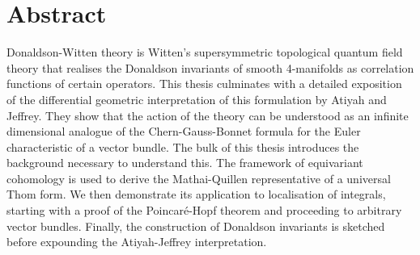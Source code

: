 \chapter*{Abstract}\label{abstract}


Donaldson-Witten theory is Witten's supersymmetric topological quantum field
theory that realises the Donaldson invariants of smooth 4-manifolds as
correlation functions of certain operators. This thesis culminates with a
detailed exposition of the differential geometric interpretation of this 
formulation by Atiyah and Jeffrey.
They show that the action of the theory can be understood as an
infinite dimensional analogue of the Chern-Gauss-Bonnet formula for the Euler
characteristic of a vector bundle. The bulk of this thesis introduces the background
necessary to understand this. The framework of equivariant cohomology is
used to derive the Mathai-Quillen representative of a universal 
Thom form. We then demonstrate its application to localisation
of integrals, starting with a proof of the Poincar\'e-Hopf theorem and
proceeding to arbitrary vector bundles. Finally, the construction of Donaldson 
invariants is sketched before expounding the Atiyah-Jeffrey interpretation. 



